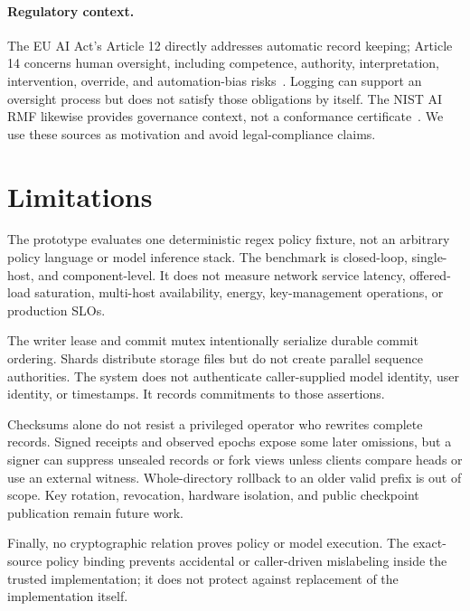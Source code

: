 \documentclass[10pt,twocolumn]{article}
\begin{document}
\paragraph{Regulatory context.}
The EU AI Act's Article 12 directly addresses automatic record keeping; Article 14 concerns human oversight, including competence, authority, interpretation, intervention, override, and automation-bias risks~\cite{eu_ai_act}. Logging can support an oversight process but does not satisfy those obligations by itself. The NIST AI RMF likewise provides governance context, not a conformance certificate~\cite{nistairmf}. We use these sources as motivation and avoid legal-compliance claims.

\section{Limitations}
The prototype evaluates one deterministic regex policy fixture, not an arbitrary policy language or model inference stack. The benchmark is closed-loop, single-host, and component-level. It does not measure network service latency, offered-load saturation, multi-host availability, energy, key-management operations, or production SLOs.

The writer lease and commit mutex intentionally serialize durable commit ordering. Shards distribute storage files but do not create parallel sequence authorities. The system does not authenticate caller-supplied model identity, user identity, or timestamps. It records commitments to those assertions.

Checksums alone do not resist a privileged operator who rewrites complete records. Signed receipts and observed epochs expose some later omissions, but a signer can suppress unsealed records or fork views unless clients compare heads or use an external witness. Whole-directory rollback to an older valid prefix is out of scope. Key rotation, revocation, hardware isolation, and public checkpoint publication remain future work.

Finally, no cryptographic relation proves policy or model execution. The exact-source policy binding prevents accidental or caller-driven mislabeling inside the trusted implementation; it does not protect against replacement of the implementation itself.
\end{document}
